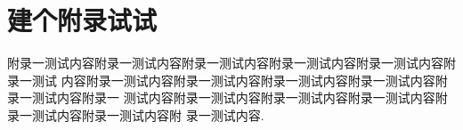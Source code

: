 \chapter{建个附录试试}

附录一测试内容附录一测试内容附录一测试内容附录一测试内容附录一测试内容附录一测试
内容附录一测试内容附录一测试内容附录一测试内容附录一测试内容附录一测试内容附录一
测试内容附录一测试内容附录一测试内容附录一测试内容附录一测试内容附录一测试内容附
录一测试内容.